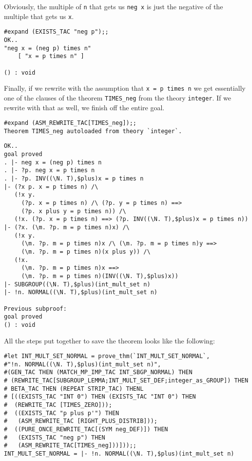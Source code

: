 Obviously, the multiple of {\small\tt n} that gets us
{\small\verb+neg x+} is just the negative of the multiple that
gets us {\small\tt x}.
\begin{session}
\begin{verbatim}
#expand (EXISTS_TAC "neg p");;
OK..
"neg x = (neg p) times n"
    [ "x = p times n" ]

() : void
\end{verbatim}
\end{session}

Finally, if we rewrite with the assumption that
{\small\verb+x = p times n+} we get essentially one of the
clauses of the theorem {\small\verb+TIMES_neg+} from the theory
{\small\verb+integer+}.  If we rewrite with that as well, we
finish off the entire goal.
\begin{session}
\begin{verbatim}
#expand (ASM_REWRITE_TAC[TIMES_neg]);;
Theorem TIMES_neg autoloaded from theory `integer`.
\end{verbatim}
\mvdots
\begin{verbatim}
OK..
goal proved
. |- neg x = (neg p) times n
. |- ?p. neg x = p times n
. |- ?p. INV((\N. T),$plus)x = p times n
|- (?x p. x = p times n) /\
   (!x y.
     (?p. x = p times n) /\ (?p. y = p times n) ==>
     (?p. x plus y = p times n)) /\
   (!x. (?p. x = p times n) ==> (?p. INV((\N. T),$plus)x = p times n))
|- (?x. (\m. ?p. m = p times n)x) /\
   (!x y.
     (\m. ?p. m = p times n)x /\ (\m. ?p. m = p times n)y ==>
     (\m. ?p. m = p times n)(x plus y)) /\
   (!x.
     (\m. ?p. m = p times n)x ==>
     (\m. ?p. m = p times n)(INV((\N. T),$plus)x))
|- SUBGROUP((\N. T),$plus)(int_mult_set n)
|- !n. NORMAL((\N. T),$plus)(int_mult_set n)

Previous subproof:
goal proved
() : void
\end{verbatim}
\end{session}

All the steps put together to save
the theorem looks like the following: 
\begin{session}
\begin{verbatim}
#let INT_MULT_SET_NORMAL = prove_thm(`INT_MULT_SET_NORMAL`,
#"!n. NORMAL((\N. T),$plus)(int_mult_set n)",
#(GEN_TAC THEN (MATCH_MP_IMP_TAC INT_SBGP_NORMAL) THEN
# (REWRITE_TAC[SUBGROUP_LEMMA;INT_MULT_SET_DEF;integer_as_GROUP]) THEN
# BETA_TAC THEN (REPEAT STRIP_TAC) THENL
# [((EXISTS_TAC "INT 0") THEN (EXISTS_TAC "INT 0") THEN
#  (REWRITE_TAC [TIMES_ZERO]));
#  ((EXISTS_TAC "p plus p'") THEN
#   (ASM_REWRITE_TAC [RIGHT_PLUS_DISTRIB]));
#  ((PURE_ONCE_REWRITE_TAC[(SYM neg_DEF)]) THEN
#   (EXISTS_TAC "neg p") THEN
#   (ASM_REWRITE_TAC[TIMES_neg]))]));;
INT_MULT_SET_NORMAL = |- !n. NORMAL((\N. T),$plus)(int_mult_set n)
\end{verbatim}
\end{session}


